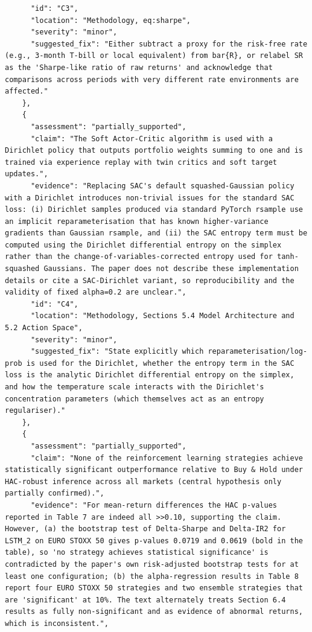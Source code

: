 \documentclass[11pt]{article}
\begin{document}
\begin{verbatim}
      "id": "C3",
      "location": "Methodology, eq:sharpe",
      "severity": "minor",
      "suggested_fix": "Either subtract a proxy for the risk-free rate (e.g., 3-month T-bill or local equivalent) from bar{R}, or relabel SR as the 'Sharpe-like ratio of raw returns' and acknowledge that comparisons across periods with very different rate environments are affected."
    },
    {
      "assessment": "partially_supported",
      "claim": "The Soft Actor-Critic algorithm is used with a Dirichlet policy that outputs portfolio weights summing to one and is trained via experience replay with twin critics and soft target updates.",
      "evidence": "Replacing SAC's default squashed-Gaussian policy with a Dirichlet introduces non-trivial issues for the standard SAC loss: (i) Dirichlet samples produced via standard PyTorch rsample use an implicit reparameterisation that has known higher-variance gradients than Gaussian rsample, and (ii) the SAC entropy term must be computed using the Dirichlet differential entropy on the simplex rather than the change-of-variables-corrected entropy used for tanh-squashed Gaussians. The paper does not describe these implementation details or cite a SAC-Dirichlet variant, so reproducibility and the validity of fixed alpha=0.2 are unclear.",
      "id": "C4",
      "location": "Methodology, Sections 5.4 Model Architecture and 5.2 Action Space",
      "severity": "minor",
      "suggested_fix": "State explicitly which reparameterisation/log-prob is used for the Dirichlet, whether the entropy term in the SAC loss is the analytic Dirichlet differential entropy on the simplex, and how the temperature scale interacts with the Dirichlet's concentration parameters (which themselves act as an entropy regulariser)."
    },
    {
      "assessment": "partially_supported",
      "claim": "None of the reinforcement learning strategies achieve statistically significant outperformance relative to Buy & Hold under HAC-robust inference across all markets (central hypothesis only partially confirmed).",
      "evidence": "For mean-return differences the HAC p-values reported in Table 7 are indeed all >>0.10, supporting the claim. However, (a) the bootstrap test of Delta-Sharpe and Delta-IR2 for LSTM_2 on EURO STOXX 50 gives p-values 0.0719 and 0.0619 (bold in the table), so 'no strategy achieves statistical significance' is contradicted by the paper's own risk-adjusted bootstrap tests for at least one configuration; (b) the alpha-regression results in Table 8 report four EURO STOXX 50 strategies and two ensemble strategies that are 'significant' at 10%. The text alternately treats Section 6.4 results as fully non-significant and as evidence of abnormal returns, which is inconsistent.",

\end{verbatim}
\end{document}
